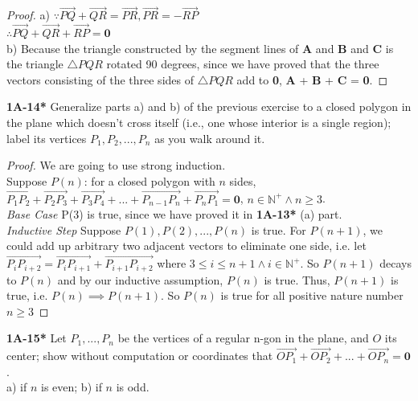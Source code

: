 \documentclass{article}
\begin{document}
%
%
\begin{proof}
a) $\because \overrightarrow{PQ} + \overrightarrow{QR} = \overrightarrow{PR}, \overrightarrow{PR} = -\overrightarrow{RP}$
\\ $\therefore \overrightarrow{PQ} + \overrightarrow{QR} + \overrightarrow{RP} = \mathbf{0}$
\\ b) Because the triangle constructed by the segment lines of \textbf{A} and \textbf{B} and \textbf{C} is the triangle $\bigtriangleup PQR$ rotated 90 degrees, since we have proved that the three vectors consisting of the three sides of $\bigtriangleup PQR$ add to \textbf{0}, \textbf{A} + \textbf{B} + \textbf{C} = \textbf{0}.
\end{proof}
%
%
\textbf{1A-14*} Generalize parts a) and b) of the previous exercise to a closed polygon in the plane which doesn't cross itself (i.e., one whose interior is a single region); label its vertices $P_1, P_2,...,P_n$ as you walk around it.
%
%
\begin{proof}
We are going to use strong induction. 
\\Suppose $P(n)$: for a closed polygon with $n$ sides, $\overrightarrow{P_1P_2} + \overrightarrow{P_2P_3} + \overrightarrow{P_3P_4} + ... + \overrightarrow{P_{n-1}P_n} + \overrightarrow{P_nP_1} = \mathbf{0}$, $n \in \mathbb{N}^+ \wedge n \geq 3$.
\\ \textit{Base Case} P(3) is true, since we have proved it in \textbf{1A-13*} (a) part.
\\ \textit{Inductive Step} Suppose $P(1), P(2), ..., P(n)$ is true. For $P(n+1)$, we could add up arbitrary two adjacent vectors to eliminate one side, i.e. let $\overrightarrow{P_iP_{i+2}} = \overrightarrow{P_iP_{i+1}} + \overrightarrow{P_{i+1}P_{i+2}}$ where $ 3 \leq i \leq n+1 \wedge i \in \mathbb{N}^+$. So $P(n+1)$ decays to $P(n)$ and by our inductive assumption, $P(n)$ is true. Thus, $P(n+1)$ is true, i.e. $P(n) \implies P(n+1)$. So $P(n)$ is true for all positive nature number $n \geq 3$
\end{proof}
%
%
\textbf{1A-15*} Let $P_1, ..., P_n$ be the vertices of a regular n-gon in the plane, and $O$ its center; show without computation or coordinates that $\overrightarrow{OP_1} + \overrightarrow{OP_2} + ... + \overrightarrow{OP_n} = \mathbf{0}$.
\\ a) if $n$ is even;  b) if $n$ is odd.
%
%
\end{document}
